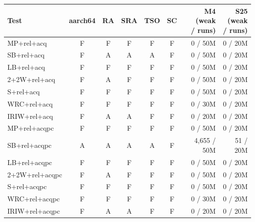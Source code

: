 \begin{tabular}{lccccccrr}
\toprule
Test & aarch64 & RA & SRA & TSO & SC &  & M4 (weak / runs) & S25 (weak / runs) \\
\midrule
MP+rel+acq & F & F & F & F & F &  & 0 / 50M & 0 / 20M \\
SB+rel+acq & F & A & A & A & F &  & 0 / 50M & 0 / 20M \\
LB+rel+acq & F & F & F & F & F &  & 0 / 50M & 0 / 20M \\
2+2W+rel+acq & F & A & F & F & F &  & 0 / 50M & 0 / 20M \\
S+rel+acq & F & F & F & F & F &  & 0 / 50M & 0 / 20M \\
WRC+rel+acq & F & F & F & F & F &  & 0 / 30M & 0 / 20M \\
IRIW+rel+acq & F & A & A & F & F &  & 0 / 20M & 0 / 20M \\
MP+rel+acqpc & F & F & F & F & F &  & 0 / 50M & 0 / 20M \\
SB+rel+acqpc & A & A & A & A & F &  & 4,655 / 50M & 51 / 20M \\
LB+rel+acqpc & F & F & F & F & F &  & 0 / 50M & 0 / 20M \\
2+2W+rel+acqpc & F & A & F & F & F &  & 0 / 50M & 0 / 20M \\
S+rel+acqpc & F & F & F & F & F &  & 0 / 50M & 0 / 20M \\
WRC+rel+acqpc & F & F & F & F & F &  & 0 / 30M & 0 / 20M \\
IRIW+rel+acqpc & F & A & A & F & F &  & 0 / 20M & 0 / 20M \\
\bottomrule
\end{tabular}
